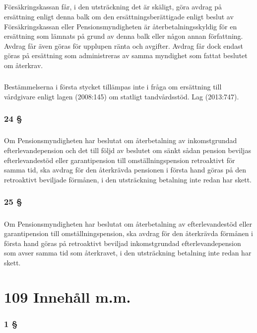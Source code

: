 \documentclass[a4paper,notitlepage,openany,10pt]{book}
\begin{document}
\paragraph*{}
Försäkringskassan får, i den utsträckning det är skäligt, göra avdrag på ersättning enligt denna balk om den ersättningsberättigade enligt beslut av Försäkringskassan eller Pensionsmyndigheten är återbetalningsskyldig för en ersättning som lämnats på grund av denna balk eller någon annan författning. Avdrag får även göras för upplupen ränta och avgifter. Avdrag får dock endast göras på ersättning som administreras av samma myndighet som fattat beslutet om återkrav.
\paragraph*{}
Bestämmelserna i första stycket tillämpas inte i fråga om ersättning till vårdgivare enligt lagen (2008:145) om statligt tandvårdsstöd.
Lag (2013:747).
\subsection*{24 §}
\paragraph*{}
Om Pensionsmyndigheten har beslutat om återbetalning av inkomstgrundad efterlevandepension och det till följd av beslutet om sänkt sådan pension beviljas efterlevandestöd eller garantipension till omställningspension retroaktivt för samma tid, ska avdrag för den återkrävda pensionen i första hand göras på den retroaktivt beviljade förmånen, i den utsträckning betalning inte redan har skett.
\subsection*{25 §}
\paragraph*{}
Om Pensionsmyndigheten har beslutat om återbetalning av efterlevandestöd eller garantipension till omställningspension, ska avdrag för den återkrävda förmånen i första hand göras på retroaktivt beviljad inkomstgrundad efterlevandepension som avser samma tid som återkravet, i den utsträckning betalning inte redan har skett.
\chapter*{109 Innehåll m.m.}
\subsection*{1 §}
\end{document}
